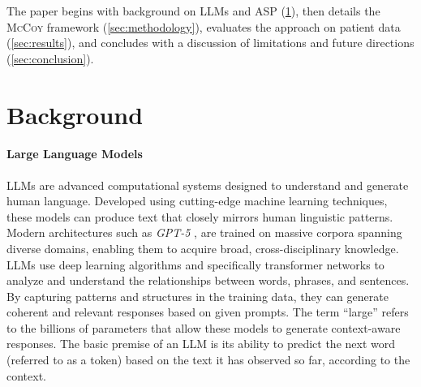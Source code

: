 \documentclass[11pt,leqno]{amsart}
\newcommand{\sys}{\textsc{McCoy}\xspace}
\begin{document}

The paper begins with background on LLMs and ASP (\cref{sec:background}), 
then details the \sys framework (\cref{sec:methodology}), 
evaluates the approach on patient data (\cref{sec:results}), 
and concludes with a discussion of limitations and future directions (\cref{sec:conclusion}).

\section{Background}\label{sec:background}

\paragraph{\textbf{Large Language Models}}
LLMs \cite{zhao2023survey} are advanced computational systems 
designed to understand and generate human language. 
Developed using cutting-edge machine learning techniques, 
these models can produce text that closely mirrors human linguistic patterns.
Modern architectures such as \textit{GPT-5} \cite{openai2023gpt4, gpt5}, 
are trained on massive corpora spanning diverse domains, 
enabling them to acquire broad, cross-disciplinary knowledge. 
LLMs use deep learning algorithms \cite{Sarker2021} 
and specifically transformer networks \cite{Dosovitskiy2020} 
to analyze and understand the relationships between words, phrases, and sentences. 
By capturing patterns and structures in the training data, 
they can generate coherent and relevant responses based on given prompts.
The term “large” refers to the billions of parameters 
that allow these models to generate context-aware responses. 
The basic premise of an LLM is its ability to predict 
the next word (referred to as a token) based on the text it has observed so far, 
according to the context.

\end{document}
